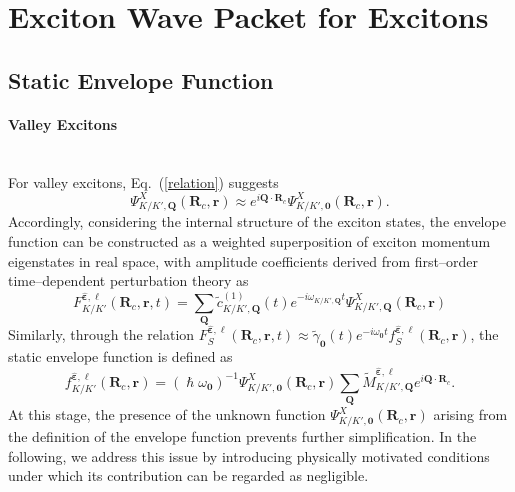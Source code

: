 \section{Exciton Wave Packet for Excitons}

\subsection{Static Envelope Function}

\paragraph*{Valley Excitons}~\\

For valley excitons, Eq.~(\ref{relation}) suggests
\begin{equation}
\Psi^{X}_{K/K',\boldsymbol{Q}}(\boldsymbol{R}_c,\boldsymbol{r})
\approx
e^{i\boldsymbol{Q}\cdot\boldsymbol{R}_c}
\Psi^{X}_{K/K',\boldsymbol{0}}(\boldsymbol{R}_c,\boldsymbol{r}).
\end{equation}
Accordingly, considering the internal structure of the exciton states, the envelope function can be constructed as a weighted superposition of exciton momentum eigenstates in real space, with amplitude coefficients derived from first--order time--dependent perturbation theory as
\begin{equation}
F_{K/K'}^{\hat{\boldsymbol{\varepsilon}}, \ell}(\boldsymbol{R}_c, \boldsymbol{r}, t)
=
\sum_{\boldsymbol{Q}}
\tilde{c}^{(1)}_{K/K',\boldsymbol{Q}}(t)
e^{-i\omega_{K/K',\boldsymbol{Q}} t}
\Psi^{X}_{K/K',\boldsymbol{Q}}(\boldsymbol{R}_c,\boldsymbol{r}) 
\label{envelope_valley}
\end{equation}
Similarly, through the relation $F_{S}^{\hat{\boldsymbol{\varepsilon}}, \ell}(\boldsymbol{R}_c, \boldsymbol{r}, t) \approx \tilde{\gamma}_{\boldsymbol{0}}(t) e^{-i\omega_{\boldsymbol{0}} t} f_{S}^{\hat{\boldsymbol{\varepsilon}}, \ell}(\boldsymbol{R}_c, \boldsymbol{r})$, the static envelope function is defined as
\begin{equation}
f_{K/K'}^{\hat{\boldsymbol{\varepsilon}}, \ell}(\boldsymbol{R}_c, \boldsymbol{r})
=
\left(\hslash \omega_{\boldsymbol{0}}\right)^{-1}
\Psi^{X}_{K/K',\boldsymbol{0}}(\boldsymbol{R}_c,\boldsymbol{r})
\sum_{\boldsymbol{Q}}
\tilde{M}^{\hat{\boldsymbol{\varepsilon}}, \ell}_{K/K',\boldsymbol{Q}}
e^{i\boldsymbol{Q}\cdot\boldsymbol{R}_c}.
\end{equation}
At this stage, the presence of the unknown function $\Psi^{X}_{K/K',\boldsymbol{0}}(\boldsymbol{R}_c,\boldsymbol{r})$ arising from the definition of the envelope function prevents further simplification. In the following, we address this issue by introducing physically motivated conditions under which its contribution can be regarded as negligible.

